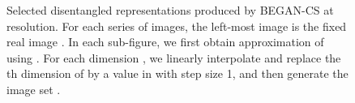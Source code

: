 \documentclass[runningheads]{llncs}
\begin{document}
    
    \begin{figure}[t]
        \centering
            
    
        
        \caption{Selected disentangled representations produced by BEGAN-CS at  resolution. For each series of images, the left-most image is the fixed real image . In each sub-figure, we first obtain approximation of  using . For each dimension , we linearly interpolate and replace the th dimension of  by a value in  with step size 1, and then generate the image set .}
        \label{figure:disentangled-representations}
    \end{figure}
\end{document}
